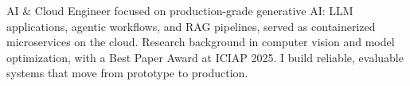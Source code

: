

\begin{cvparagraph}

AI \& Cloud Engineer focused on production-grade generative AI: LLM applications, agentic workflows, and RAG pipelines, served as containerized microservices on the cloud. Research background in computer vision and model optimization, with a Best Paper Award at ICIAP 2025. I build reliable, evaluable systems that move from prototype to production.

\end{cvparagraph}
